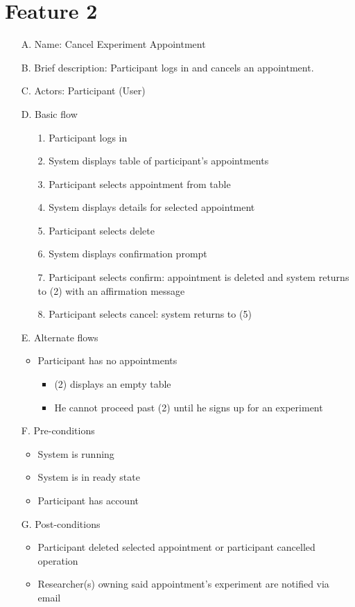 \documentclass{article}
\begin{document}
\section{Feature 2}
\begin{enumerate}
\item[A.] Name: Cancel Experiment Appointment
\item[B.] Brief description: Participant logs in and cancels an appointment.
\item[C.] Actors: Participant (User)
\item[D.] Basic flow
    \begin{enumerate}
    \item[1.] Participant logs in
    \item[2.] System displays table of participant's appointments
    \item[3.] Participant selects appointment from table
    \item[4.] System displays details for selected appointment
    \item[5.] Participant selects delete
    \item[6.] System displays confirmation prompt
    \item[7.] Participant selects confirm: appointment is deleted and system returns to (2) with an affirmation message
    \item[8.] Participant selects cancel: system returns to (5)
    \end{enumerate}
\item[E.] Alternate flows
    \begin{itemize}
    \item Participant has no appointments
        \begin{itemize}
        \item (2) displays an empty table
        \item He cannot proceed past (2) until he signs up for an experiment
        \end{itemize}
    \end{itemize}
\item[F.] Pre-conditions
    \begin{itemize}
    \item System is running
    \item System is in ready state
    \item Participant has account
    \end{itemize}
\item[G.] Post-conditions
    \begin{itemize}
    \item Participant deleted selected appointment or participant cancelled operation
    \item Researcher(s) owning said appointment's experiment are notified via email
    \end{itemize}
\end{enumerate}
\end{document}
